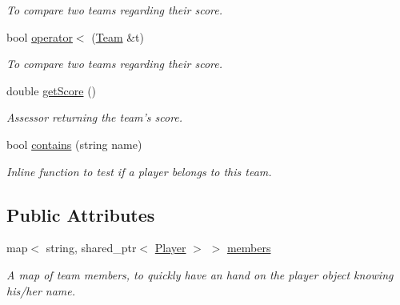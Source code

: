 \begin{DoxyCompactItemize}
\begin{DoxyCompactList}\small\item\em \-To compare two teams regarding their score. \end{DoxyCompactList}\item 
\hypertarget{classTeam_a3d03b0049c53f3ba8632b4f0ffb6f385}{bool \hyperlink{classTeam_a3d03b0049c53f3ba8632b4f0ffb6f385}{operator$<$} (\hyperlink{classTeam}{\-Team} \&t)}\label{classTeam_a3d03b0049c53f3ba8632b4f0ffb6f385}

\begin{DoxyCompactList}\small\item\em \-To compare two teams regarding their score. \end{DoxyCompactList}\item 
\hypertarget{classTeam_a87c5336a6fb6b87b569e73031e78dfa4}{double \hyperlink{classTeam_a87c5336a6fb6b87b569e73031e78dfa4}{get\-Score} ()}\label{classTeam_a87c5336a6fb6b87b569e73031e78dfa4}

\begin{DoxyCompactList}\small\item\em \-Assessor returning the team's score. \end{DoxyCompactList}\item 
bool \hyperlink{classTeam_ab0fe5bff14090bc5ab8ce90a81780412}{contains} (string name)
\begin{DoxyCompactList}\small\item\em \-Inline function to test if a player belongs to this team. \end{DoxyCompactList}\end{DoxyCompactItemize}
\subsection*{\-Public \-Attributes}
\begin{DoxyCompactItemize}
\item 
\hypertarget{classTeam_a5e2f0bd7b2f9885e7d99c0b1c612b5fa}{map$<$ string, shared\-\_\-ptr$<$ \hyperlink{classPlayer}{\-Player} $>$ $>$ \hyperlink{classTeam_a5e2f0bd7b2f9885e7d99c0b1c612b5fa}{members}}\label{classTeam_a5e2f0bd7b2f9885e7d99c0b1c612b5fa}

\begin{DoxyCompactList}\small\item\em \-A map of team members, to quickly have an hand on the player object knowing his/her name. \end{DoxyCompactList}\end{DoxyCompactItemize}
